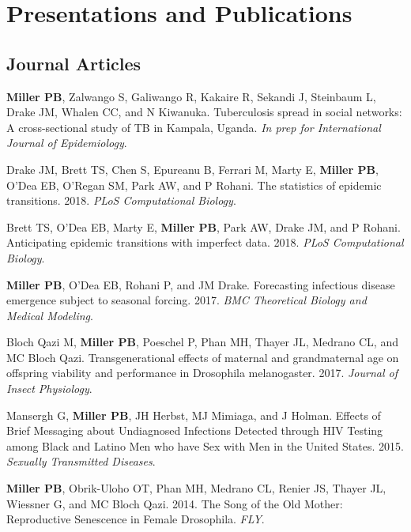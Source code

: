 \documentclass[letterpaper]{article}
\renewenvironment{itemize}{
  \begin{list}{}{
    \setlength{\leftmargin}{1.5em}
  }
}{
  \end{list}
}
\begin{document}
\section*{Presentations and Publications}

\subsection*{Journal Articles}

\begin{itemize}
\item   \textbf{Miller PB}, Zalwango S, Galiwango R, Kakaire R, Sekandi J, Steinbaum L, Drake JM, Whalen CC, and N Kiwanuka. Tuberculosis spread in social networks: A cross-sectional study of TB in Kampala, Uganda. \textit{In prep for International Journal of Epidemiology}. 
\item Drake JM, Brett TS,  Chen S, Epureanu B, Ferrari M, Marty E, \textbf{Miller PB}, O'Dea EB, O'Regan SM, Park AW, and P Rohani. The statistics of epidemic transitions. 2018. \textit{PLoS Computational Biology}. 
\item Brett TS,  O'Dea EB, Marty E, \textbf{Miller PB}, Park AW, Drake JM, and P Rohani. Anticipating epidemic transitions with imperfect data. 2018. \textit{PLoS Computational Biology}. 
\item \textbf{Miller PB}, O'Dea EB, Rohani P, and JM Drake. Forecasting infectious disease emergence subject to seasonal forcing. 2017. \textit{BMC Theoretical Biology and Medical Modeling}.
\item Bloch Qazi M, \textbf{Miller PB}, Poeschel P, Phan MH, Thayer JL, Medrano CL, and MC Bloch Qazi. Transgenerational effects of maternal and grandmaternal age on offspring viability and performance in Drosophila melanogaster. 2017. \textit{Journal of Insect Physiology}.
\item Mansergh G, \textbf{Miller PB}, JH Herbst, MJ Mimiaga, and J Holman. Effects of Brief Messaging about Undiagnosed Infections Detected through HIV Testing among Black and Latino Men who have Sex with Men in the United States. 2015. \textit{Sexually Transmitted Diseases}.
\item \textbf{Miller PB}, Obrik-Uloho OT, Phan MH, Medrano CL, Renier JS, Thayer JL, Wiessner G, and MC Bloch Qazi. 2014. The Song of the Old Mother: Reproductive Senescence in Female Drosophila. \textit{FLY}.
\end{itemize}
\end{document}
